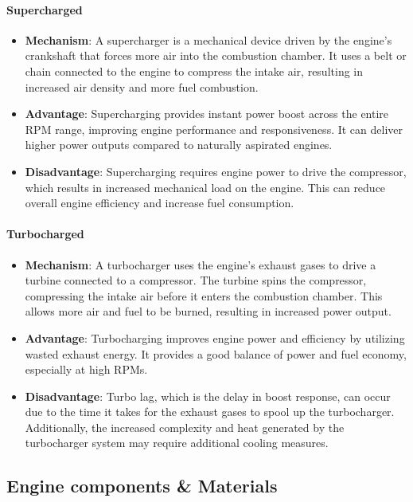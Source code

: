 \documentclass{article}
\begin{document}
\paragraph*{Supercharged}
\begin{itemize}
	\item \textbf{Mechanism}: A supercharger is a mechanical device driven by the engine's crankshaft that forces more air into the combustion chamber. It uses a belt or chain connected to the engine to compress the intake air, resulting in increased air density and more fuel combustion.
	\item \textbf{Advantage}: Supercharging provides instant power boost across the entire RPM range, improving engine performance and responsiveness. It can deliver higher power outputs compared to naturally aspirated engines.
	\item \textbf{Disadvantage}: Supercharging requires engine power to drive the compressor, which results in increased mechanical load on the engine. This can reduce overall engine efficiency and increase fuel consumption.
\end{itemize}

\paragraph*{Turbocharged}
\begin{itemize}
	\item \textbf{Mechanism}: A turbocharger uses the engine's exhaust gases to drive a turbine connected to a compressor. The turbine spins the compressor, compressing the intake air before it enters the combustion chamber. This allows more air and fuel to be burned, resulting in increased power output.
	\item \textbf{Advantage}: Turbocharging improves engine power and efficiency by utilizing wasted exhaust energy. It provides a good balance of power and fuel economy, especially at high RPMs.
	\item \textbf{Disadvantage}: Turbo lag, which is the delay in boost response, can occur due to the time it takes for the exhaust gases to spool up the turbocharger. Additionally, the increased complexity and heat generated by the turbocharger system may require additional cooling measures.
\end{itemize}

\subsection*{Engine components \& Materials}
\end{document}
